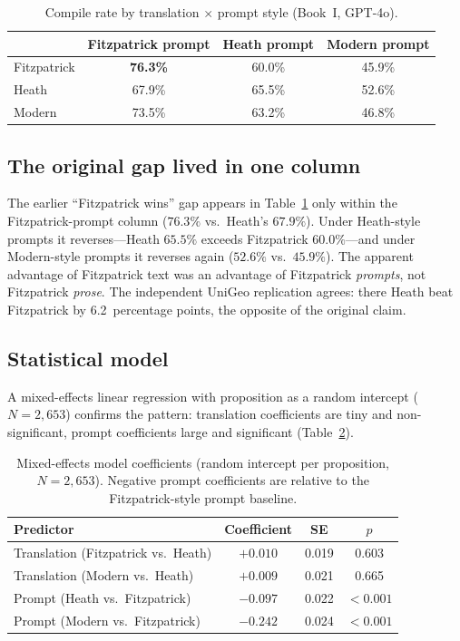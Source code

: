 \documentclass[11pt]{article}
\begin{document}
\begin{table}[h]
\centering
\caption{Compile rate by translation $\times$ prompt style (Book~I, GPT-4o).}
\begin{tabular}{lccc}
\toprule
 & Fitzpatrick prompt & Heath prompt & Modern prompt \\
\midrule
Fitzpatrick & \textbf{76.3\%} & 60.0\% & 45.9\% \\
Heath       & 67.9\%          & 65.5\% & 52.6\% \\
Modern      & 73.5\%          & 63.2\% & 46.8\% \\
\bottomrule
\end{tabular}
\label{tab:grid}
\end{table}

\subsection{The original gap lived in one column}

The earlier ``Fitzpatrick wins'' gap appears in Table~\ref{tab:grid} only within
the Fitzpatrick-prompt column ($76.3\%$ vs.\ Heath's $67.9\%$). Under
Heath-style prompts it reverses---Heath $65.5\%$ exceeds Fitzpatrick
$60.0\%$---and under Modern-style prompts it reverses again ($52.6\%$ vs.\
$45.9\%$). The apparent advantage of Fitzpatrick text was an advantage of
Fitzpatrick \emph{prompts}, not Fitzpatrick \emph{prose}. The independent UniGeo
replication agrees: there Heath beat Fitzpatrick by 6.2~percentage points, the
opposite of the original claim.

\subsection{Statistical model}

A mixed-effects linear regression with proposition as a random intercept
($N=2{,}653$) confirms the pattern: translation coefficients are tiny and
non-significant, prompt coefficients large and significant (Table~\ref{tab:coef}).

\begin{table}[h]
\centering
\caption{Mixed-effects model coefficients (random intercept per proposition,
$N=2{,}653$). Negative prompt coefficients are relative to the Fitzpatrick-style
prompt baseline.}
\begin{tabular}{lccc}
\toprule
Predictor & Coefficient & SE & $p$ \\
\midrule
Translation (Fitzpatrick vs.\ Heath) & $+0.010$ & 0.019 & 0.603 \\
Translation (Modern vs.\ Heath)      & $+0.009$ & 0.021 & 0.665 \\
Prompt (Heath vs.\ Fitzpatrick)      & $\mathbf{-0.097}$ & 0.022 & $\mathbf{<0.001}$ \\
Prompt (Modern vs.\ Fitzpatrick)     & $\mathbf{-0.242}$ & 0.024 & $\mathbf{<0.001}$ \\
\bottomrule
\end{tabular}
\label{tab:coef}
\end{table}
\end{document}
